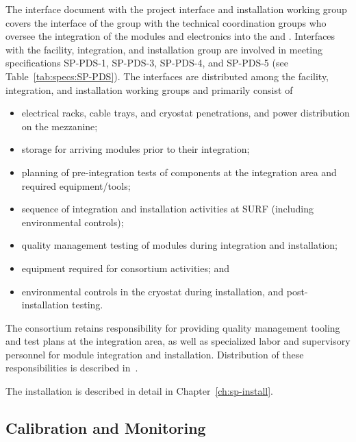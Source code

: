 The interface document with the project interface and installation working group covers the interface of the  group with the technical coordination groups who oversee the integration of the  modules and electronics into the  and . Interfaces with the facility, integration, and installation group are involved in meeting specifications SP-PDS-1, SP-PDS-3, SP-PDS-4, and SP-PDS-5 (see Table~\ref{tab:specs:SP-PDS}).  The interfaces are distributed among the facility, integration, and installation working groups and primarily consist of
\begin{itemize}
    \item electrical racks, cable trays, and cryostat penetrations, and power distribution on the mezzanine;
    \item storage for arriving  modules prior to their integration;
    \item planning of pre-integration tests of  components at the integration area and required equipment/tools;
    \item sequence of integration and installation activities at SURF (including environmental controls);
    \item quality management testing of  modules during integration and installation;
    \item equipment required for  consortium activities; and
    \item environmental controls in the cryostat during installation, and post-installation testing.
\end{itemize}

The  consortium retains responsibility for providing quality management tooling and test plans at the integration area, as well as specialized labor and supervisory personnel for  module integration and installation. Distribution of these responsibilities is described in~. %

The installation is described in detail in Chapter~\ref{ch:sp-install}.


\subsection{Calibration and Monitoring}
\label{sec:fdsp-pd-intfc-calib}

